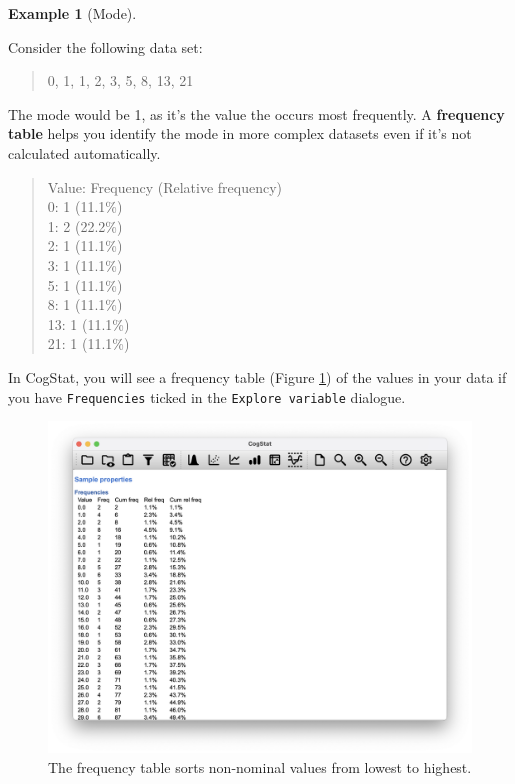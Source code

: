 \documentclass[
]{book}
\theoremstyle{definition}
\theoremstyle{definition}
\newtheorem{example}{Example}[chapter]
\theoremstyle{definition}
\theoremstyle{definition}
\theoremstyle{remark}
\begin{document}
\begin{example}[Mode]
\protect\hypertarget{exm:exmode}{}\label{exm:exmode}

Consider the following data set:

\begin{quote}
0, 1, 1, 2, 3, 5, 8, 13, 21
\end{quote}

The mode would be 1, as it's the value the occurs most frequently. A \textbf{frequency table} helps you identify the mode in more complex datasets even if it's not calculated automatically.

\begin{quote}
Value: Frequency (Relative frequency)\\
0: 1 (11.1\%)\\
1: 2 (22.2\%)\\
2: 1 (11.1\%)\\
3: 1 (11.1\%)\\
5: 1 (11.1\%)\\
8: 1 (11.1\%)\\
13: 1 (11.1\%)\\
21: 1 (11.1\%)\\
\end{quote}

\end{example}

In CogStat, you will see a frequency table (Figure \ref{fig:freqaflsmall}) of the values in your data if you have \texttt{Frequencies} ticked in the \texttt{Explore\ variable} dialogue.

\begin{figure}

{\centering \includegraphics[width=0.66\linewidth]{resources/image/cogstatfrequencyaflsmall} 

}

\caption{The frequency table sorts non-nominal values from lowest to highest.}\label{fig:freqaflsmall}
\end{figure}
\end{document}
